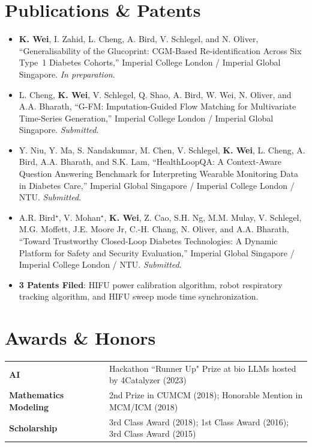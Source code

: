 \documentclass[a4paper,10pt]{article}
\newenvironment{zitemize}{
\vspace{0.1cm}
\begin{itemize}\itemsep 1.5pt \parskip 2pt \parsep 5pt}
{\end{itemize}\vspace{-0.3cm}}
\newcommand{\hskills}[1]{
\textbf{\bfseries #1} }
\begin{document}
\section{Publications \& Patents}
\begin{zitemize}
    \item \textbf{K. Wei}, I. Zahid, L. Cheng, A. Bird, V. Schlegel, and N. Oliver, ``Generalisability of the Glucoprint: CGM-Based Re-identification Across Six Type~1 Diabetes Cohorts,'' Imperial College London / Imperial Global Singapore. \textit{In preparation}.
    \item L. Cheng, \textbf{K. Wei}, V. Schlegel, Q. Shao, A. Bird, W. Wei, N. Oliver, and A.A. Bharath, ``G-FM: Imputation-Guided Flow Matching for Multivariate Time-Series Generation,'' Imperial College London / Imperial Global Singapore. \textit{Submitted}.
    \item Y. Niu, Y. Ma, S. Nandakumar, M. Chen, V. Schlegel, \textbf{K. Wei}, L. Cheng, A. Bird, A.A. Bharath, and S.K. Lam, ``HealthLoopQA: A Context-Aware Question Answering Benchmark for Interpreting Wearable Monitoring Data in Diabetes Care,'' Imperial Global Singapore / Imperial College London / NTU. \textit{Submitted}.
    \item A.R. Bird$^\star$, V. Mohan$^\star$, \textbf{K. Wei}, Z. Cao, S.H. Ng, M.M. Mulay, V. Schlegel, M.G. Moffett, J.E. Moore Jr, C.-H. Chang, N. Oliver, and A.A. Bharath, ``Toward Trustworthy Closed-Loop Diabetes Technologies: A Dynamic Platform for Safety and Security Evaluation,'' Imperial Global Singapore / Imperial College London / NTU. \textit{Submitted}.
    \item \textbf{3 Patents Filed}: HIFU power calibration algorithm, robot respiratory tracking algorithm, and HIFU sweep mode time synchronization.
\end{zitemize}

\section{Awards \& Honors}
\begin{tabular}[t]{ p{11em} p{1em} p{43em}}
\hskills{AI} && Hackathon ``Runner Up" Prize at bio LLMs hosted by 4Catalyzer (2023) \\
\hskills{Mathematics Modeling} && 2nd Prize in CUMCM (2018); Honorable Mention in MCM/ICM (2018) \\
\hskills{Scholarship} && 3rd Class Award (2018); 1st Class Award (2016); 3rd Class Award (2015) \\
\end{tabular}
\end{document}
